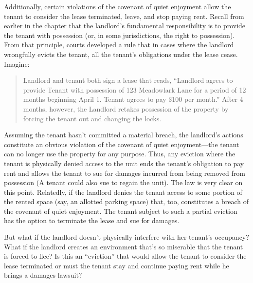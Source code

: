 Additionally, certain violations of the covenant of quiet enjoyment allow the
tenant to consider the lease terminated, leave, and stop paying rent.  Recall
from earlier in the chapter that the landlord's fundamental responsibility is
to provide the tenant with possession (or, in some jurisdictions, the right to
possession).  From that principle, courts developed a rule that in cases where
the landlord wrongfully evicts the tenant, all the tenant's obligations under
the lease cease.  Imagine:
\begin{quote}\edfont
Landlord and tenant both sign a lease that reads, ``Landlord agrees to provide
Tenant with possession of 123 Meadowlark Lane for a period of 12 months
beginning April 1.  Tenant agrees to pay \$100 per month.''  After 4 months,
however, the Landlord retakes possession of the property by forcing the tenant
out and changing the locks. 
\end{quote}
Assuming the tenant hasn't committed a material breach, the landlord's actions
constitute an obvious violation of the covenant of quiet enjoyment---the tenant
can no longer use the property for any purpose. Thus, any eviction where the
tenant is physically denied access to the unit ends the tenant's obligation to
pay rent and allows the tenant to sue for damages incurred from being removed
from possession (A tenant could also sue to regain the unit).  The law is very
clear on this point.  Relatedly, if the landlord denies the tenant access to
some portion of the rented space (say, an allotted parking space) that, too,
constitutes a breach of the covenant of quiet enjoyment.  The tenant subject to
such a partial eviction has the option to terminate the lease and sue for
damages.  

But what if the landlord doesn't physically interfere with her tenant's
occupancy? What if the landlord creates an environment that's so miserable that
the tenant is forced to flee?  Is this an ``eviction'' that would allow the
tenant to consider the lease terminated or must the tenant stay and continue
paying rent while he brings a damages lawsuit?

